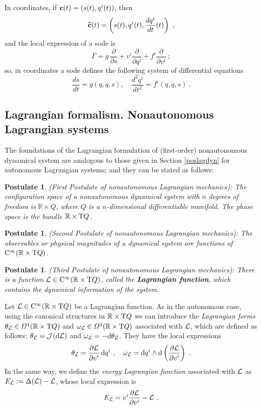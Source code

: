 \documentclass[12pt]{report}
\newtheorem{pos}[teor]{Postulate}
\def\derpar#1#2{\frac{\partial{#1}}{\partial{#2}}}
\def\df{{\mit\Omega}}
\def\Lag{{\cal L}}
\def\d{{\rm d}}
\def\Real{\mathbb{R}}
\def\Tan{{\rm T}}
\def\Cinfty{{\rm C}^\infty}
\begin{document}
In coordinates, if 
${\bf c}(t)=(s(t),q^i(t))$, 
then
$$
\widehat{\bf c}(t) =
\left(s(t),q^i(t),\frac{d q^i}{d t}(t)\right) \ ,
$$
and the local expression of a {\sc sode} is
$$
\Gamma= g\,\frac{\partial}{\partial s} +
v^i \frac{\partial}{\partial q^i} +
f^i \frac{\partial}{\partial v^i} \ ;
$$
so, in coordinates a {\sc sode} defines the following system of
differential equations
$$
\frac{d s}{d t}=g(q,\dot q,s)  ,\quad  
\frac{d^2 q^i}{d t^2}=f^i(q,\dot q,s) \ .
$$


\subsection{Lagrangian formalism. Nonautonomous Lagrangian systems}


The foundations of the Lagrangian formulation of
(first-order) nonautonomous dynamical system are analogous to those given
in Section \ref{poslagdyn} for autonomous Lagrangian systems; 
and they can be stated as follows:

\begin{pos}
{\rm (First Postulate of nonautonomous Lagrangian mechanics\/)}:
The configuration space of a nonautonomous dynamical system with $n$ degrees of freedom 
is $\Real\times Q$, where $Q$ is a $n$-dimensional differentiable manifold.
The phase space is the bundle $\Real\times\Tan Q$.
\end{pos}

\begin{pos}
{\rm (Second Postulate of nonautonomous Lagrangian mechanics\/)}:
The observables or physical magnitudes of a 
dynamical system are functions of $\Cinfty (\Real\times\Tan Q)$.
\end{pos}

\begin{pos}
{\rm (Third Postulate of nonautonomous Lagrangian mechanics\/)}:
There is a function $\Lag\in\Cinfty (\Real\times\Tan Q)$, 
called the \textbf{Lagrangian function},
which contains the dynamical information of the system.
\end{pos}

Let $\Lag\in\Cinfty(\Real\times\Tan Q)$ be a Lagrangian function.
As in the autonomous case, using the canonical structures in 
$\Real\times\Tan Q$ we can introduce the {\sl Lagrangian forms} $\theta_\Lag\in\df^1(\Real\times\Tan Q)$ and
 $\omega_\Lag\in\df^2(\Real\times\Tan Q)$ associated with $\Lag$,
 which are defined as follows:
 $\theta_\Lag={\cal J}(\d\Lag)$ and $\omega_\Lag=-\d\theta_\Lag$.
They have the  local expressions
$$
\theta_\Lag= \displaystyle\frac{\displaystyle\partial
\Lag}{\displaystyle\partial v^i}\, \d q^i\ ,\quad 
\omega_\Lag=\d q^i\wedge\d \left(\frac{\displaystyle\partial
\Lag}{\displaystyle\partial v^i}\right) \  .
$$
In the same way, we define the {\sl energy Lagrangian function} associated with $\Lag$ as
$E_\Lag:=\Delta(\Lag)-\Lag$, whose local expression is
$$
E_\Lag=v^i\derpar{\Lag}{v^i}-\Lag\ .
$$
\end{document}
